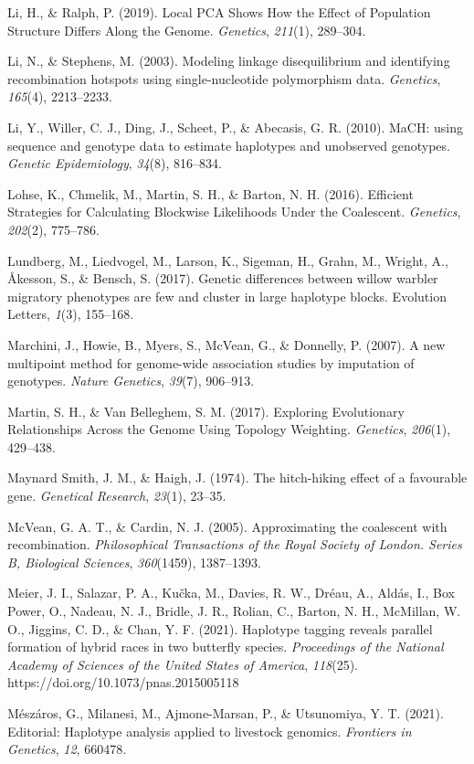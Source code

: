\documentclass[twocolumn]{bmcart}%
\begin{document}
\begin{backmatter}
Li, H., \& Ralph, P. (2019). Local PCA Shows How the Effect of
Population Structure Differs Along the Genome. \emph{Genetics},
\emph{211}(1), 289--304.

Li, N., \& Stephens, M. (2003). Modeling linkage disequilibrium and
identifying recombination hotspots using single-nucleotide polymorphism
data. \emph{Genetics}, \emph{165}(4), 2213--2233.

Li, Y., Willer, C. J., Ding, J., Scheet, P., \& Abecasis, G. R. (2010).
MaCH: using sequence and genotype data to estimate haplotypes and
unobserved genotypes. \emph{Genetic Epidemiology}, \emph{34}(8),
816--834.

Lohse, K., Chmelik, M., Martin, S. H., \& Barton, N. H. (2016).
Efficient Strategies for Calculating Blockwise Likelihoods Under the
Coalescent. \emph{Genetics}, \emph{202}(2), 775--786.

Lundberg, M., Liedvogel, M., Larson, K., Sigeman, H., Grahn, M., Wright,
A., Åkesson, S., \& Bensch, S. (2017). Genetic differences between
willow warbler migratory phenotypes are few and cluster in large
haplotype blocks. Evolution Letters, \emph{1}(3), 155--168.

Marchini, J., Howie, B., Myers, S., McVean, G., \& Donnelly, P. (2007).
A new multipoint method for genome-wide association studies by
imputation of genotypes. \emph{Nature Genetics}, \emph{39}(7), 906--913.

Martin, S. H., \& Van Belleghem, S. M. (2017). Exploring Evolutionary
Relationships Across the Genome Using Topology Weighting.
\emph{Genetics}, \emph{206}(1), 429--438.

Maynard Smith, J. M., \& Haigh, J. (1974). The hitch-hiking effect of a
favourable gene. \emph{Genetical Research}, \emph{23}(1), 23--35.

McVean, G. A. T., \& Cardin, N. J. (2005). Approximating the coalescent
with recombination. \emph{Philosophical Transactions of the Royal
Society of London. Series B, Biological Sciences}, \emph{360}(1459),
1387--1393.

Meier, J. I., Salazar, P. A., Kučka, M., Davies, R. W., Dréau, A.,
Aldás, I., Box Power, O., Nadeau, N. J., Bridle, J. R., Rolian, C.,
Barton, N. H., McMillan, W. O., Jiggins, C. D., \& Chan, Y. F. (2021).
Haplotype tagging reveals parallel formation of hybrid races in two
butterfly species. \emph{Proceedings of the National Academy of Sciences
of the United States of America}, \emph{118}(25).
https://doi.org/10.1073/pnas.2015005118

Mészáros, G., Milanesi, M., Ajmone-Marsan, P., \& Utsunomiya, Y. T.
(2021). Editorial: Haplotype analysis applied to livestock genomics.
\emph{Frontiers in Genetics}, \emph{12}, 660478.


\end{backmatter}
\end{document}
